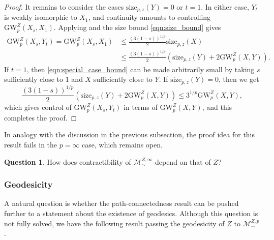 \documentclass[twoside,11pt]{article}
\theoremstyle{definition}
\newtheorem{question}[theorem]{Question}
\newcommand{\M}{\mathcal{M}}
\newcommand{\MZp}{\M_{\sim}^{Z,p}}
\newcommand{\dgwz}{\mathrm{GW}_p^Z}
\begin{document}
\begin{proof}
  It remains to consider the cases $\mathrm{size}_{p,z}(Y) = 0$ or $t = 1$. In either case, $Y_t$ is weakly isomorphic to $X_1$, and continuity amounts to controlling $\dgwz(X_s,X_1)$. Applying  and the size bound  \eqref{eqn:size_bound} gives
  \begin{align}
  \dgwz(X_s,Y_t) = \dgwz(X_s,X_1) &\leq \frac{(3(1-s))^{1/p}}{2} \mathrm{size}_{p,z}(X)\\
  &\leq \frac{(3(1-s))^{1/p}}{2}(\mathrm{size}_{p,z}(Y) + 2 \dgwz(X,Y)). \label{eqn:special_case_bound}
  \end{align}
  If $t=1$, then \eqref{eqn:special_case_bound} can be made arbitrarily small by taking $s$ sufficiently close to $1$ and $X$ sufficiently close to $Y$. If $\mathrm{size}_{p,z}(Y)= 0$, then we get 
  \[
   \frac{(3(1-s))^{1/p}}{2}(\mathrm{size}_{p,z}(Y) + 2 \dgwz(X,Y)) \leq 3^{1/p} \dgwz(X,Y),
  \]
  which gives control of $\dgwz(X_s,Y_t)$ in terms of $\dgwz(X,Y)$, and this completes the proof. 
\end{proof}
 

In analogy with the discussion in the previous subsection, the proof idea for this result fails in the $p=\infty$ case, which remains open. \begin{question}\label{question:contractibility}
    How does contractibility of $\mathcal{M}_\sim^{Z,\infty}$ depend on that of $Z$?
\end{question}


\subsubsection{Geodesicity}

A natural question is whether the path-connectedness result  can be pushed further to a statement about the existence of geodesics. Although this question is not fully solved, we have the following result passing the geodesicity of $Z$ to $\MZp$. 
\end{document}
